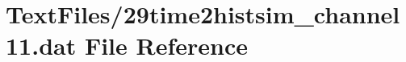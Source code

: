 \hypertarget{29time2histsim__channel11_8dat}{}\section{Text\+Files/29time2histsim\+\_\+channel11.dat File Reference}
\label{29time2histsim__channel11_8dat}

